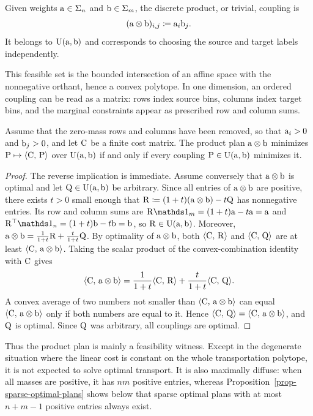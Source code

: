 \begin{defn}\label{def-discrete-product-coupling}
	Given weights $\mathrm{a}\in\Sigma_n$ and $\mathrm{b}\in\Sigma_m$, the discrete product, or trivial, coupling is
	\[
		(\mathrm{a}\otimes\mathrm{b})_{i,j}\coloneqq \mathrm{a}_i\mathrm{b}_j.
	\]
	It belongs to $\mathrm{U}(\mathrm{a},\mathrm{b})$ and corresponds to choosing the source and target labels independently.
\end{defn}
This feasible set is the bounded intersection of an affine space with the nonnegative orthant, hence a convex polytope. In one dimension, an ordered coupling can be read as a matrix: rows index source bins, columns index target bins, and the marginal constraints appear as prescribed row and column sums.

\begin{prop}\label{prop-discrete-product-coupling-degenerate}
	Assume that the zero-mass rows and columns have been removed, so that $\mathrm{a}_i>0$ and $\mathrm{b}_j>0$, and let $\mathrm{C}$ be a finite cost matrix. The product plan $\mathrm{a}\otimes\mathrm{b}$ minimizes $\mathrm{P}\mapsto\langle \mathrm{C},\,\mathrm{P}\rangle$ over $\mathrm{U}(\mathrm{a},\mathrm{b})$ if and only if every coupling $\mathrm{P}\in\mathrm{U}(\mathrm{a},\mathrm{b})$ minimizes it.
\end{prop}
\begin{proof}
	The reverse implication is immediate. Assume conversely that $\mathrm{a}\otimes\mathrm{b}$ is optimal and let $\mathrm{Q}\in\mathrm{U}(\mathrm{a},\mathrm{b})$ be arbitrary. Since all entries of $\mathrm{a}\otimes\mathrm{b}$ are positive, there exists $t>0$ small enough that
	\(\mathrm{R}\coloneqq (1+t)(\mathrm{a}\otimes\mathrm{b})-t\mathrm{Q}\)
	has nonnegative entries. Its row and column sums are $\R\ones_m=(1+t)\a-t\a=\a$ and $\R^\top\ones_n=(1+t)\b-t\b=\b$, so $\mathrm{R}\in\mathrm{U}(\mathrm{a},\mathrm{b})$. Moreover,
	\(\mathrm{a}\otimes\mathrm{b}=\frac{1}{1+t}\mathrm{R}+\frac{t}{1+t}\mathrm{Q}\).
	By optimality of $\mathrm{a}\otimes\mathrm{b}$, both $\langle \mathrm{C},\,\mathrm{R}\rangle$ and $\langle \mathrm{C},\,\mathrm{Q}\rangle$ are at least $\langle \mathrm{C},\,\mathrm{a}\otimes\mathrm{b}\rangle$. Taking the scalar product of the convex-combination identity with $\mathrm{C}$ gives
	\[
		\langle \mathrm{C},\,\mathrm{a}\otimes\mathrm{b}\rangle
		=
		\frac{1}{1+t}\langle \mathrm{C},\,\mathrm{R}\rangle
		+\frac{t}{1+t}\langle \mathrm{C},\,\mathrm{Q}\rangle.
	\]
	A convex average of two numbers not smaller than $\langle \mathrm{C},\,\mathrm{a}\otimes\mathrm{b}\rangle$ can equal $\langle \mathrm{C},\,\mathrm{a}\otimes\mathrm{b}\rangle$ only if both numbers are equal to it. Hence $\langle \mathrm{C},\,\mathrm{Q}\rangle=\langle \mathrm{C},\,\mathrm{a}\otimes\mathrm{b}\rangle$, and $\mathrm{Q}$ is optimal. Since $\mathrm{Q}$ was arbitrary, all couplings are optimal.
\end{proof}

Thus the product plan is mainly a feasibility witness. Except in the degenerate situation where the linear cost is constant on the whole transportation polytope, it is not expected to solve optimal transport. It is also maximally diffuse: when all masses are positive, it has $nm$ positive entries, whereas Proposition~\ref{prop-sparse-optimal-plans} shows below that sparse optimal plans with at most $n+m-1$ positive entries always exist.

